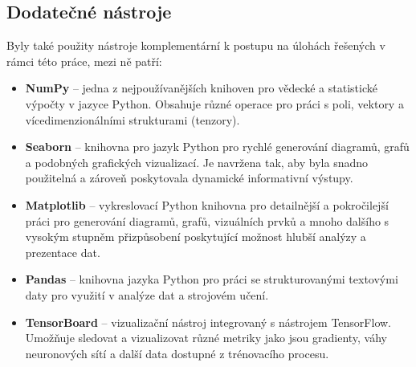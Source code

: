 \subsection{Dodatečné nástroje}
\label{sec:Chapter511}
Byly také použity nástroje komplementární k postupu na úlohách řešených v rámci této práce, mezi ně patří:
\begin{itemize}
    \item \textbf{NumPy} -- jedna z nejpoužívanějších knihoven pro vědecké a statistické výpočty v jazyce Python. Obsahuje různé operace pro práci s poli, vektory a vícedimenzionálními  strukturami (tenzory).
    \item \textbf{Seaborn} -- knihovna pro jazyk Python pro rychlé generování diagramů, grafů a podobných grafických vizualizací. Je navržena tak, aby byla snadno použitelná a zároveň poskytovala dynamické informativní výstupy.
    \item \textbf{Matplotlib} -- vykreslovací Python knihovna pro detailnější a pokročilejší práci pro generování diagramů, grafů, vizuálních prvků a mnoho dalšího s vysokým stupněm přizpůsobení poskytující možnost hlubší analýzy a prezentace dat.
    \item \textbf{Pandas} -- knihovna jazyka Python pro práci se strukturovanými textovými daty pro využití v analýze dat a strojovém učení.
    \item \textbf{TensorBoard} -- vizualizační nástroj integrovaný s nástrojem TensorFlow. Umožňuje sledovat a vizualizovat různé metriky jako jsou gradienty, váhy neuronových sítí a další data dostupné z trénovacího procesu.
\end{itemize}
\endinput